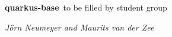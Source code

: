 \textbf{quarkus-base}\ to be filled by student group

\textit{Jörn Neumeyer and Maurits van der Zee}